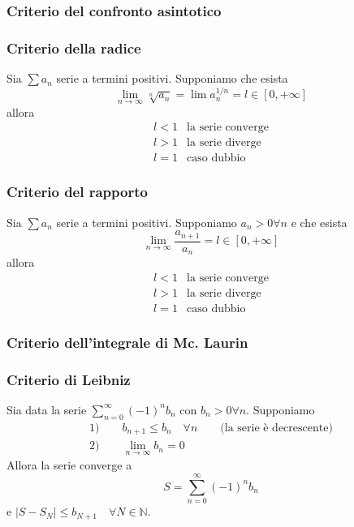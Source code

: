 \documentclass[x11names]{article}
\begin{document}
	\subsubsection{Criterio del confronto asintotico}
	\subsubsection{Criterio della radice} 
	Sia \(\sum a_{n}\) serie a termini positivi. Supponiamo che esista
	\[ 
	\lim_{n\to \infty} \sqrt[n]{a_{n}} = \lim a^{1/n}_{n} = l \in [0,+\infty]
	\]
	allora 
	\[ 
	\begin{array}{ll}
		l<1 & \text{la serie converge} \\
		l>1 & \text{la serie diverge} \\
		l=1 & \text{caso dubbio}
	\end{array}
	\]
	\subsubsection{Criterio del rapporto} 
	Sia \(\sum a_{n}\) serie a termini positivi. Supponiamo \(a_{n} > 0 \forall n\) e che esista
	\[ 
	\lim_{n\to \infty} \frac{a_{n+1}}{a_{n}} =  l \in [0,+\infty]
	\]
	allora 
	\[ 
	\begin{array}{ll}
		l<1 & \text{la serie converge} \\
		l>1 & \text{la serie diverge} \\
		l=1 & \text{caso dubbio}
	\end{array}
	\]
	\subsubsection{Criterio dell'integrale di Mc. Laurin}
	\subsubsection{Criterio di Leibniz} 
	Sia data la serie \(\sum_{n=0}^{\infty}(-1)^n b_{n}\) con \(b_{n} > 0 \forall n\). Supponiamo
	\[ 
	\begin{array}{l}
		1) \qquad b_{n+1} \leq b_{n} \quad \forall n \qquad \text{(la serie è decrescente)} \\
		2) \qquad \lim_{n\to\infty} b_{n} = 0
	\end{array}
	\]
	Allora la serie converge a 
	\[ 
	S = \sum_{n=0}^{\infty}(-1)^nb_{n}
	\]
	e \(|S - S_{N}| \leq b_{N+1} \quad \forall N \in \mathbb{N}\).
	
\end{document}
